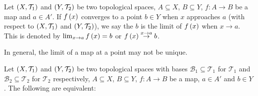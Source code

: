 \begin{remark}
  Let $\left(X,\mathcal{T}_1\right)$ and $\left(Y,\mathcal{T}_2\right)$ be two topological spaces, $A\subseteq X$, $B\subseteq Y$, $f:A\rightarrow B$ be a map and $a\in A'$. If $f\left(x\right)$ converges to a point $b\in  Y$ when $x$ approaches $a$ (with respect to $\left(X,\mathcal{T}_1\right)$ and $\left(Y,\mathcal{T}_2\right)$), we say the $b$ is the limit of $f\left(x\right)$ when $x\to a$. This is denoted by $\lim_{x\to a}{f\left(x\right)}=b$ or $f\left(x\right)\stackrel{x\to a}{\to}b$.

  In general, the limit of a map at a point may not be unique.
\end{remark}

\begin{proposition}
  Let $\left(X,\mathcal{T}_1\right)$ and $\left(Y,\mathcal{T}_2\right)$ be two topological spaces with bases $\mathcal{B}_1\subseteq\mathcal{T}_1$ for $\mathcal{T}_1$ and $\mathcal{B}_2\subseteq\mathcal{T}_2$ for $\mathcal{T}_2$ respectively, $A\subseteq X$, $B\subseteq Y$, $f:A\rightarrow B$ be a map, $a\in A'$ and $b\in Y$. The following are equivalent:
  

\end{proposition}

